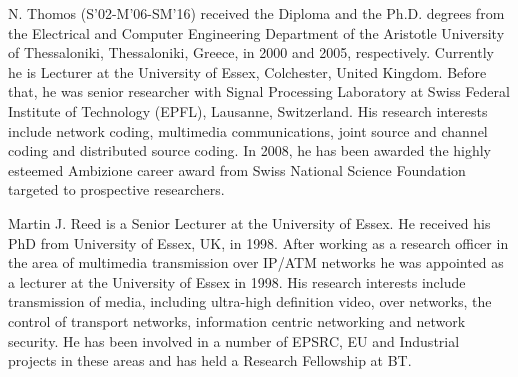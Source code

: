 \documentclass[journal]{IEEEtran}
\begin{document}
\begin{IEEEbiography}{N. Thomos}
	(S'02-M'06-SM'16) received the Diploma and the Ph.D. degrees from the Electrical and Computer Engineering Department of the Aristotle University of Thessaloniki, Thessaloniki, Greece, in 2000 and 2005, respectively. Currently he is Lecturer at the University of Essex, Colchester, United Kingdom. Before that, he was senior researcher with Signal Processing Laboratory at Swiss Federal Institute of Technology (EPFL), Lausanne, Switzerland. His research interests include network coding, multimedia communications, joint source and channel coding and distributed source coding. In 2008, he has been awarded the highly esteemed Ambizione career award from Swiss National Science Foundation targeted to prospective researchers.
\end{IEEEbiography}
\begin{IEEEbiography}{Martin J. Reed} is a Senior Lecturer at the University of Essex. He received his PhD from University of Essex, UK, in
1998. After working as a research officer in the area of multimedia
transmission over IP/ATM networks he was appointed as a lecturer at the
University of Essex in 1998. His research interests include transmission
of media, including ultra-high definition video, over networks, the control
of transport networks, information centric networking and
network security. He has been involved in a number of EPSRC, EU and Industrial projects in these areas and has held a Research Fellowship at BT.
\end{IEEEbiography}
\vfill
\end{document}
